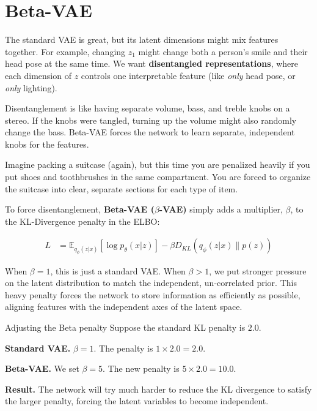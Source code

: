 \documentclass[a4paper,11pt]{article}
\newcommand{\vocab}[1]{\textbf{\color{navy}#1}}
\begin{document}
\section{Beta-VAE}
The standard VAE is great, but its latent dimensions might mix features together. For example, changing $z_1$ might change both a person's smile and their head pose at the same time. We want \vocab{disentangled representations}, where each dimension of $z$ controls one interpretable feature (like \emph{only} head pose, or \emph{only} lighting).

\begin{intuition}
Disentanglement is like having separate volume, bass, and treble knobs on a stereo. If the knobs were tangled, turning up the volume might also randomly change the bass. Beta-VAE forces the network to learn separate, independent knobs for the features.
\end{intuition}

\begin{everyday}
Imagine packing a suitcase (again), but this time you are penalized heavily if you put shoes and toothbrushes in the same compartment. You are forced to organize the suitcase into clear, separate sections for each type of item.
\end{everyday}

To force disentanglement, \vocab{Beta-VAE ($\beta$-VAE)} simply adds a multiplier, $\beta$, to the KL-Divergence penalty in the ELBO:

\begin{align}
  L &= \mathbb{E}_{q_\phi(z|x)} \left[ \log p_\theta(x|z) \right] - \beta D_{KL}(q_\phi(z|x) \parallel p(z))
\end{align}

When $\beta = 1$, this is just a standard VAE. When $\beta > 1$, we put stronger pressure on the latent distribution to match the independent, un-correlated prior. This heavy penalty forces the network to store information as efficiently as possible, aligning features with the independent axes of the latent space.

\begin{worked}{Adjusting the Beta penalty}
Suppose the standard KL penalty is $2.0$.
\begin{steps}
  \item \textbf{Standard VAE.} $\beta = 1$. The penalty is $1 \times 2.0 = 2.0$.
  \item \textbf{Beta-VAE.} We set $\beta = 5$. The new penalty is $5 \times 2.0 = 10.0$.
  \item \textbf{Result.} The network will try much harder to reduce the KL divergence to satisfy the larger penalty, forcing the latent variables to become independent.
\end{steps}
\end{worked}
\end{document}
